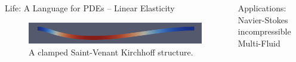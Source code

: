 \documentclass[final,utf8,,hyperref={pdfpagelabels=false}]{beamer}
\begin{document}
\begin{frame}[containsverbatim]{}
\begin{columns}[t]
\begin{block}{Life: A Language for PDEs -- Linear Elasticity}
\begin{figure}[H]
\centering
\label{fig:schemaint}	
\includegraphics[width=.9\linewidth]{structure}
\caption{A clamped Saint-Venant Kirchhoff structure.}
\end{figure}


  \end{block}


  \begin{block}{Applications: Navier-Stokes incompressible Multi-Fluid}
    

\end{block}
\end{columns}
\end{frame}
\end{document}
